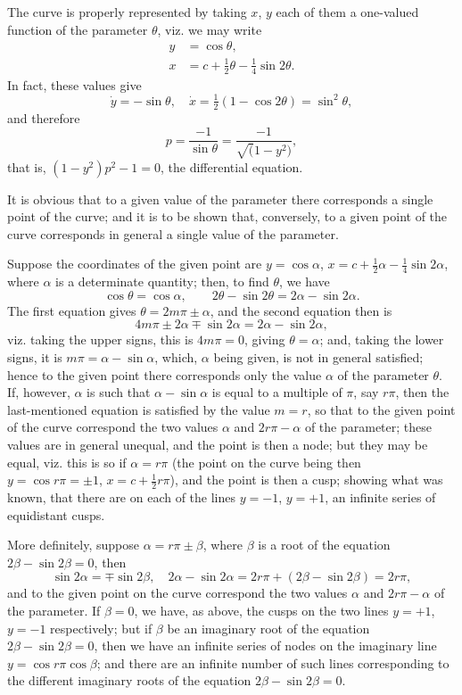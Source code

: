 \documentclass[11pt,a4paper]{book}
\begin{document}
The curve is properly represented by taking $x$, $y$ each of them a one-valued function of the parameter $\theta$, viz. we may write
\begin{align*}
y &= \cos\theta, \\
x &= c + \tfrac{1}{2}\theta - \tfrac{1}{4}\sin 2\theta.
\end{align*}
In fact, these values give
\[
\dot{y} = -\sin\theta, \quad \dot{x} = \tfrac{1}{2}(1 - \cos 2\theta) = \sin^2\theta,
\]
and therefore
\[
p = \frac{-1}{\sin\theta} = \frac{-1}{\surd(1-y^2)},
\]
that is, $(1-y^2)p^2 - 1 = 0$, the differential equation.

It is obvious that to a given value of the parameter there corresponds a single point of the curve; and it is to be shown that, conversely, to a given point of the curve corresponds in general a single value of the parameter.

Suppose the coordinates of the given point are $y = \cos\alpha$, $x = c + \frac{1}{2}\alpha - \frac{1}{4}\sin 2\alpha$, where $\alpha$ is a determinate quantity; then, to find $\theta$, we have
\[
\cos\theta = \cos\alpha, \qquad 2\theta - \sin 2\theta = 2\alpha - \sin 2\alpha.
\]
The first equation gives $\theta = 2m\pi \pm \alpha$, and the second equation then is
\[
4m\pi \pm 2\alpha \mp \sin 2\alpha = 2\alpha - \sin 2\alpha,
\]
viz. taking the upper signs, this is $4m\pi = 0$, giving $\theta = \alpha$; and, taking the lower signs, it is $m\pi = \alpha - \sin\alpha$, which, $\alpha$ being given, is not in general satisfied; hence to the given point there corresponds only the value $\alpha$ of the parameter $\theta$. If, however, $\alpha$ is such that $\alpha - \sin\alpha$ is equal to a multiple of $\pi$, say $r\pi$, then the last-mentioned equation is satisfied by the value $m = r$, so that to the given point of the curve correspond the two values $\alpha$ and $2r\pi - \alpha$ of the parameter; these values are in general unequal, and the point is then a node; but they may be equal, viz. this is so if $\alpha = r\pi$ (the point on the curve being then $y = \cos r\pi = \pm 1$, $x = c + \frac{1}{2}r\pi$), and the point is then a cusp; showing what was known, that there are on each of the lines $y = -1$, $y = +1$, an infinite series of equidistant cusps.

More definitely, suppose $\alpha = r\pi \pm \beta$, where $\beta$ is a root of the equation $2\beta - \sin 2\beta = 0$, then
\[
\sin 2\alpha = \mp \sin 2\beta, \quad 2\alpha - \sin 2\alpha = 2r\pi + (2\beta - \sin 2\beta) = 2r\pi,
\]
and to the given point on the curve correspond the two values $\alpha$ and $2r\pi - \alpha$ of the parameter. If $\beta = 0$, we have, as above, the cusps on the two lines $y = +1$, $y = -1$ respectively; but if $\beta$ be an imaginary root of the equation $2\beta - \sin 2\beta = 0$, then we have an infinite series of nodes on the imaginary line $y = \cos r\pi \cos\beta$; and there are an infinite number of such lines corresponding to the different imaginary roots of the equation $2\beta - \sin 2\beta = 0$.
\end{document}
